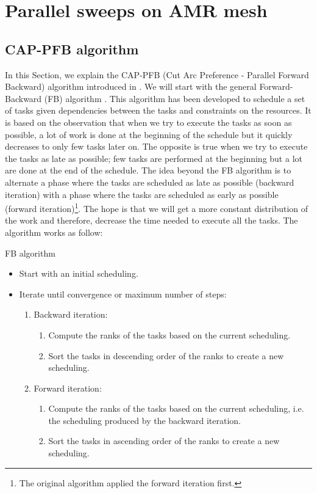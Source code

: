 \documentclass{mc2015}
\renewcommand{\(}{\left(}
\renewcommand{\)}{\right)}
\renewcommand{\[}{\left[}
\renewcommand{\]}{\right]}
\begin{document}
\section{Parallel sweeps on AMR mesh} \label{parallel_sweeps}

\subsection{CAP-PFB algorithm}

In this Section, we explain the CAP-PFB (Cut Arc Preference - Parallel Forward
Backward) algorithm introduced in \cite{Mo2014}. We will start with the general
Forward-Backward (FB) algorithm \cite{Li1992}. This algorithm has been developed
to schedule a set of tasks given dependencies between the tasks and constraints
on the resources. It is based on the observation that when we try to execute the
tasks as soon as possible, a lot of work is done at the beginning of the
schedule but it quickly decreases to only few tasks later
on. The opposite is true when we try to execute the tasks as late as possible;
few tasks are performed at the beginning but a lot are done at the end
of the schedule. The idea beyond the FB algorithm is to alternate a phase where the
tasks are scheduled as late as possible (backward iteration) with a phase where the
tasks are scheduled as early as possible (forward iteration)\footnote{The
original algorithm applied the forward iteration first.}. The hope is
that we will get a more constant distribution of the work and therefore,
decrease the time needed to execute all the tasks. The algorithm works as
follow:
\begin{algorithm}[H]
  \caption{FB algorithm}
  \begin{itemize}
    \item Start with an initial scheduling.
    \item Iterate until convergence or maximum number of steps:
      \begin{enumerate}
        \item Backward iteration:
          \begin{enumerate}
            \item Compute the ranks of the tasks based on the current scheduling.
            \item Sort the tasks in descending order of the ranks to create a
              new scheduling.
          \end{enumerate}
        \item Forward iteration:
          \begin{enumerate}
            \item Compute the ranks of the tasks based on the current
              scheduling, i.e. the scheduling produced by the backward
              iteration.
            \item Sort the tasks in ascending order of the ranks to create a new
              scheduling.
          \end{enumerate}
      \end{enumerate}
  \end{itemize}
  \label{fb}
\end{algorithm}
\end{document}
